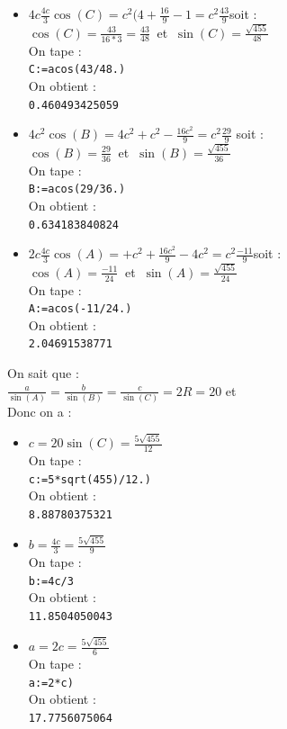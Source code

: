 \documentclass[a4paper,11pt]{book}
\begin{document}
\begin{itemize}
\item $\displaystyle 4c\frac{4c}{3}\cos(C)=c^2(4+\frac{16}{9}-1=c^2\frac{43}{9}$soit :\\
$\displaystyle \cos(C)=\frac{43}{16*3}=\frac{43}{48}\ $ et 
$\displaystyle\ \sin(C)=\frac{\sqrt{455}}{48}$\\
On tape :\\
{\tt C:=acos(43/48.)}\\
On obtient :\\
{\tt 0.460493425059}\\
\item 
$\displaystyle 4c^2\cos(B)=4c^2+c^2-\frac{16c^2}{9}=c^2\frac{29}{9}$ soit : \\
$\displaystyle \cos(B)=\frac{29}{36}\ $
et 
$\displaystyle\ \sin(B)=\frac{\sqrt{455}}{36}$\\
On tape :\\
{\tt B:=acos(29/36.)}\\
On obtient :\\
{\tt 0.634183840824}\\
\item 
$\displaystyle 2c\frac{4c}{3}\cos(A)=+c^2+\frac{16c^2}{9}-4c^2=c^2\frac{-11}{9}$soit : \\
$\displaystyle \cos(A)=\frac{-11}{24}\ $ et 
$\displaystyle \ \sin(A)=\frac{\sqrt{455}}{24}$\\
On tape :\\
{\tt A:=acos(-11/24.)}\\
On obtient :\\
{\tt 2.04691538771}\\
\end{itemize}
On sait que :\\
$\displaystyle \frac{a}{\sin(A)}=\frac{b}{\sin(B)}=\frac{c}{\sin(C)}=2R=20$ et \\
Donc on a :\\
\begin{itemize}
\item $\displaystyle c=20\sin(C)=\frac{5\sqrt{455}}{12}$\\
On tape :\\
{\tt c:=5*sqrt(455)/12.)}\\
On obtient :\\
{\tt 8.88780375321}\\
\item $\displaystyle b=\frac{4c}{3}=\frac{5\sqrt{455}}{9}$\\
On tape :\\
{\tt b:=4c/3}\\
On obtient :\\
{\tt 11.8504050043}\\
\item $\displaystyle a=2c=\frac{5\sqrt{455}}{6}$\\
On tape :\\
{\tt a:=2*c)}\\
On obtient :\\
{\tt 17.7756075064}\\
\end{itemize}
\end{document}
